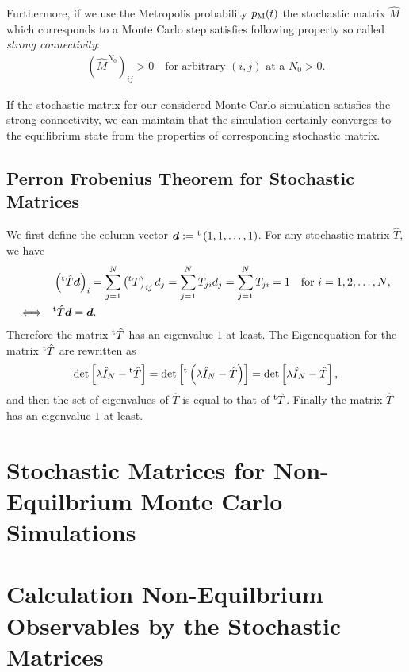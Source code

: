 Furthermore, if we use the Metropolis probability $p_{\rm M}(t)$ the stochastic matrix $\hat{M}$ which corresponds to a Monte Carlo step satisfies following property so called \textit{strong connectivity}:
\begin{align}
\left(\hat{M}^{N_{0}}\right)_{ij}>0\quad\text{for arbitrary $(i,j)$ at a $N_{0}>0$}.
\end{align}

If the stochastic matrix for our considered Monte Carlo simulation satisfies the strong connectivity, we can maintain that the simulation certainly converges to the equilibrium state from the properties of corresponding stochastic matrix.

\subsection{Perron Frobenius Theorem for Stochastic Matrices}

We first define the column vector $\bm{d}:={}^{\rm t}\left(1,1,\dots,1\right)$. For any stochastic matrix $\hat{T}$, we have
\begin{align}
&\left({}^{\rm t}\hat{T}\bm{d}\right)_{i}=\sum_{j=1}^{N}\left({}^{t}T\right)_{ij}d_{j}=\sum_{j=1}^{N}T_{ji}d_{j}=\sum_{j=1}^{N}T_{ji}=1\quad\text{for $i=1,2,\dots,N$},\\
\Longleftrightarrow\quad &{}^{\rm t}\hat{T}\bm{d} = \bm{d}.
\end{align}
Therefore the matrix ${}^{\rm t}\hat{T}$ has an eigenvalue $1$ at least. The Eigenequation for the matrix ${}^{\rm t}\hat{T}$ are rewritten as
\begin{align}
\det\left[\lambda \hat{I}_{N} - {}^{\rm t}\hat{T}\right] = \det\left[{}^{\rm t}\left(\lambda \hat{I}_{N} - \hat{T}\right)\right] = \det\left[\lambda \hat{I}_{N} - \hat{T}\right],
\end{align}
and then the set of eigenvalues of $\hat{T}$ is equal to that of ${}^{\rm t}\hat{T}$. Finally the matrix $\hat{T}$ has an eigenvalue $1$ at least.

\section{Stochastic Matrices for Non-Equilbrium Monte Carlo Simulations}

\section{Calculation Non-Equilbrium Observables by the Stochastic Matrices}
